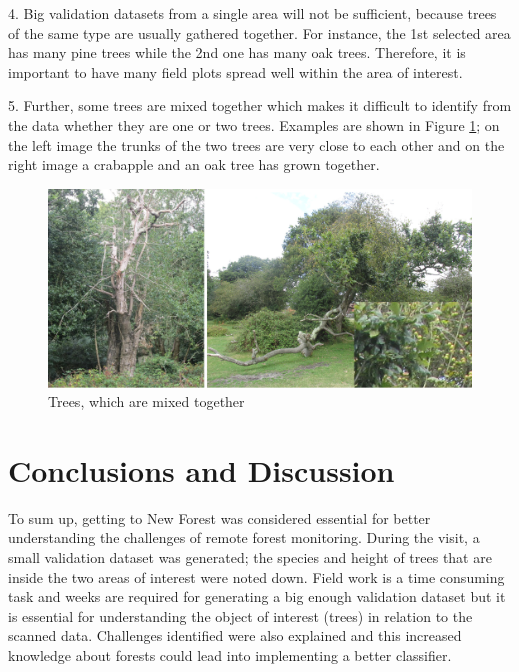 \documentclass{subfiles}
\begin{document}
   
    
    \par 4.	Big validation datasets from a single area will not be sufficient, because trees of the same type are usually gathered together. For instance, the 1st selected area has many pine trees while the 2nd one has many oak trees. Therefore, it is important to have many field plots spread well within the area of interest.  
    
    \par 5.	Further, some trees are mixed together which makes it difficult to identify from the data whether they are one or two trees. Examples are shown in Figure \ref{fig:CC_MixedTrees}; on the left image the trunks of the two trees are very close to each other and on the right image a crabapple and an oak tree has grown together. 
    
    \begin{figure} [!h]
    	\centering
    	\includegraphics[width=\textwidth]{img/NewForest/CC_MixedTrees}
    	\caption{Trees, which are mixed together}
    	\label{fig:CC_MixedTrees}
    \end{figure}
    
    \section{Conclusions and Discussion }
    \par To sum up, getting to New Forest was considered essential for better understanding the challenges of remote forest monitoring. During the visit, a small validation dataset was generated; the species and height of trees that are inside the two areas of interest were noted down. Field work is a time consuming task and weeks are required for generating a big enough validation dataset but it is essential for understanding the object of interest (trees) in relation to the scanned data. Challenges identified were also explained and this increased knowledge about forests could lead into implementing a better classifier. 
    
\end{document}
